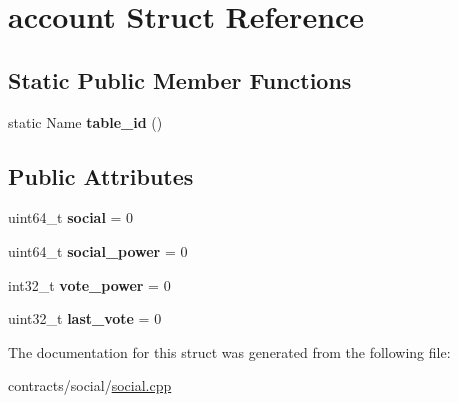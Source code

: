 \hypertarget{structaccount}{}\section{account Struct Reference}
\label{structaccount}
\subsection*{Static Public Member Functions}
\begin{DoxyCompactItemize}
\item 
\mbox{\label{structaccount_ad99ab903d03a52a31b14458932a75012}} 
static Name {\bfseries table\+\_\+id} ()
\end{DoxyCompactItemize}
\subsection*{Public Attributes}
\begin{DoxyCompactItemize}
\item 
\mbox{\label{structaccount_aae478ef655df0a8bf9b3ea6551f6fa10}} 
uint64\+\_\+t {\bfseries social} = 0
\item 
\mbox{\label{structaccount_a8236971cdea04078b89cdac37e0d8597}} 
uint64\+\_\+t {\bfseries social\+\_\+power} = 0
\item 
\mbox{\label{structaccount_a72334e05c0d00424a4112f349e06ea42}} 
int32\+\_\+t {\bfseries vote\+\_\+power} = 0
\item 
\mbox{\label{structaccount_a1b6f555894deefad1820a810dfb5a969}} 
uint32\+\_\+t {\bfseries last\+\_\+vote} = 0
\end{DoxyCompactItemize}


The documentation for this struct was generated from the following file\+:\begin{DoxyCompactItemize}
\item 
contracts/social/\mbox{\hyperlink{social_8cpp}{social.\+cpp}}\end{DoxyCompactItemize}
